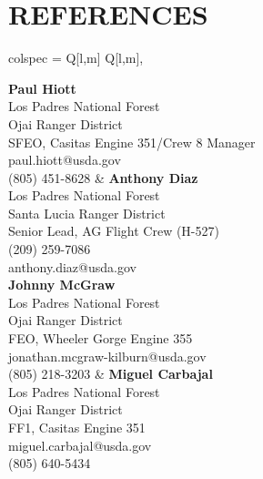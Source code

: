 \documentclass[a4paper,9pt]{extarticle}
\begin{document}
\section*{REFERENCES}

\begin{center}
\begin{tblr}{
    colspec = {Q[l,m] Q[l,m]},
}

{\textbf{Paul Hiott} \\
Los Padres National Forest \\
Ojai Ranger District \\
SFEO, Casitas Engine 351/Crew 8 Manager \\
paul.hiott@usda.gov \\
(805) 451-8628}
&
{\textbf{Anthony Diaz} \\
Los Padres National Forest \\
Santa Lucia Ranger District \\
Senior Lead, AG Flight Crew (H-527) \\
(209) 259-7086 \\
anthony.diaz@usda.gov} \\

{\textbf{Johnny McGraw} \\
Los Padres National Forest \\
Ojai Ranger District \\
FEO, Wheeler Gorge Engine 355 \\
jonathan.mcgraw-kilburn@usda.gov \\
(805) 218-3203}
&
{\textbf{Miguel Carbajal} \\
Los Padres National Forest \\
Ojai Ranger District \\
FF1, Casitas Engine 351 \\
miguel.carbajal@usda.gov \\
(805) 640-5434}

\end{tblr}
\end{center}
\end{document}
